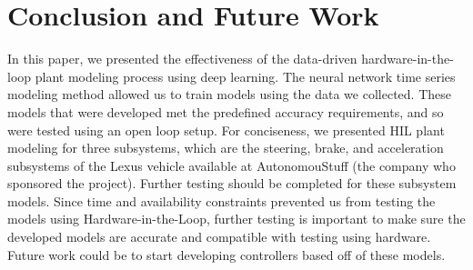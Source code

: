\documentclass[conference]{IEEEtran}
\begin{document}
\section{Conclusion and Future Work}
\label{sec:conclustionAndFutureWork}

In this paper, we presented the effectiveness of the data-driven hardware-in-the-loop plant modeling process using deep learning. The neural network time series modeling method  allowed us to train models using the data we collected. These models that were developed met the predefined accuracy requirements, and so were tested using an open loop setup. For conciseness, we presented HIL plant modeling for three subsystems, which are the steering, brake, and acceleration subsystems of the Lexus vehicle available at AutonomouStuff (the company who sponsored the project). Further testing should be completed for these subsystem models. Since time and availability constraints prevented us from testing the models using Hardware-in-the-Loop, further testing is important to make sure the developed models are accurate and compatible with testing using hardware. Future work  could be to start developing controllers based off of these models.

\clearpage


\end{document}
